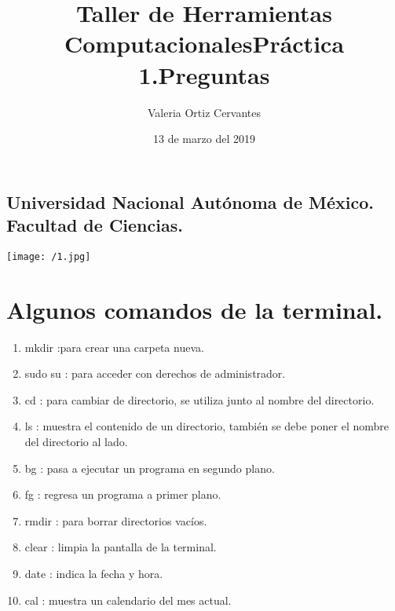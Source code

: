 \documentclass{article}
\title{\Huge Taller de Herramientas Computacionales}
\author{\huge Valeria Ortiz Cervantes}
\date{13 de marzo del 2019}
\begin{document}
\maketitle
\begin{center}
	\subsection*{\LARGE Universidad Nacional Autónoma de México.\\Facultad de Ciencias.\\}
	\texttt{[image: /1.jpg]}
\end{center}
\newpage
\begin{center}
	\title{\LARGE Práctica 1.Preguntas}
\end{center}
\section*{Algunos comandos de la terminal.}
\begin{enumerate}
	\item mkdir :para crear una carpeta nueva.
	\item sudo su : para acceder con derechos de administrador.
	\item cd : para cambiar de directorio, se utiliza junto al nombre del directorio.
	\item ls : muestra el contenido de un directorio, también se debe poner el nombre del directorio al lado. 
	\item bg : pasa a ejecutar un programa en segundo plano.
	\item fg : regresa un programa a primer plano.
	\item rmdir : para borrar directorios vacíos.
	\item clear : limpia la pantalla de la terminal. 
	\item date : indica la fecha y hora.
	\item cal : muestra un calendario del mes actual.
\end{enumerate}
\end{document}
